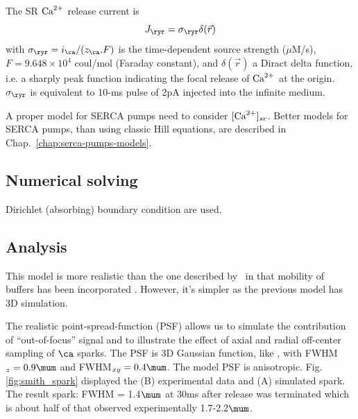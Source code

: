 The SR ${\text{Ca}^{2+}}$ release current is
\begin{equation}
  \label{eq:1118}
  J_\ryr = \sigma_\ryr \delta(\vec{r})
\end{equation}
with $\sigma_\ryr=i_\ca/(z_\ca.F)$ is the time-dependent source strength
($\mu$M/s), $F=9.648\times 10^4$ coul/mol (Faraday constant), and
$\delta(\vec{r})$ a Diract delta function, i.e.
a sharply peak function indicating the focal release of ${\text{Ca}^{2+}}$ at the origin.
$\sigma_\ryr$ is equivalent to 10-ms pulse of 2pA injected into the
infinite medium.


\begin{framed}
  A proper model for SERCA pumps need to consider $[{\text{Ca}^{2+}}]_{sr}$. Better
  models for SERCA pumps, than using classic Hill equations, are
  described in Chap.~\ref{chap:serca-pumps-models}.
\end{framed}




\subsection{Numerical solving}
\label{sec:numerical-solving-1}

Dirichlet (absorbing) boundary condition are used. 

\subsection{Analysis}
\label{sec:analysis-14}

This model is more realistic than the one described
by~\citep{pratusevich1996} in that mobility of buffers has been
incorporated . However, it's simpler as the previous model has 3D simulation.


The realistic point-spread-function (PSF) allows us to simulate the contribution
of ``out-of-focus'' signal and to illustrate the effect of axial and radial
off-center sampling of $\ca$ sparks. The PSF is 3D Gaussian function, like
\citep{pratusevich1996}, with FWHM$_z=0.9\mum$ and FWHM$_{xy}=0.4\mum$. The
model PSF is anisotropic. Fig. \ref{fig:smith_spark} displayed the (B)
experimental data and (A) simulated spark. The result spark: FWHM = 1.4$\mum$ at
30ms after release was terminated which is about half of that observed
experimentally 1.7-2.2$\mum$.

